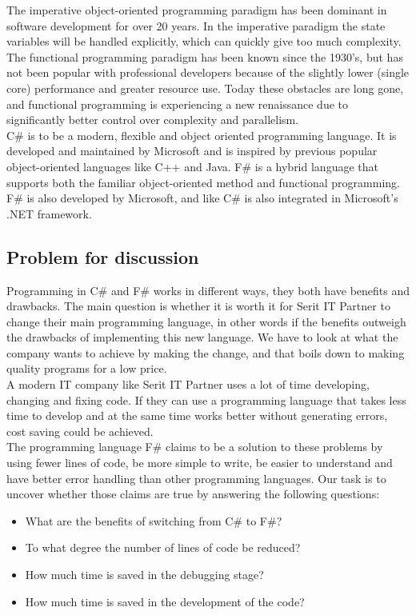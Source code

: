\documentclass[12pt, a4paper]{article}
\begin{document}
The imperative object-oriented programming paradigm has been dominant in software development for over 20 years. In the imperative paradigm the state variables will be handled explicitly, which can quickly give too much complexity. The functional programming paradigm has been known since the 1930’s, but has not been popular with professional developers because of the slightly lower (single core) performance and greater resource use. Today these obstacles are long gone, and functional programming is experiencing a new renaissance due to significantly better control over complexity and parallelism.\\

C\# is to be a modern, flexible and object oriented programming language. It is developed and maintained by Microsoft and is inspired by previous popular object-oriented languages like C++ and Java. F\# is a hybrid language that supports both the familiar object-oriented method and functional programming. F\# is also developed by Microsoft, and like C\# is also integrated in Microsoft’s .NET framework.

\newpage
\subsection{Problem for discussion}
Programming in C\# and F\# works in different ways, they both have benefits and drawbacks. The main question is whether it is worth it for Serit IT Partner to change their main programming language, in other words if the benefits outweigh the drawbacks of implementing this new language. We have to look at what the company wants to achieve by making the change, and that boils down to making quality programs for a low price. \\

A modern IT company like Serit IT Partner uses a lot of time developing, changing and fixing code. If they can use a programming language that takes less time to develop and at the same time works better without generating errors, cost saving could be achieved.\\

The programming language F\# claims to be a solution to these problems by using fewer lines of code, be more simple to write, be easier to understand and have better error handling than other programming languages. Our task is to uncover whether those claims are true by answering the following questions:

\begin{itemize}
\item What are the benefits of switching from C\# to F\#?
\item To what degree the number of lines of code be reduced?
\item How much time is saved in the debugging stage?
\item How much time is saved in the development of the code?
\end{itemize}
\end{document}
